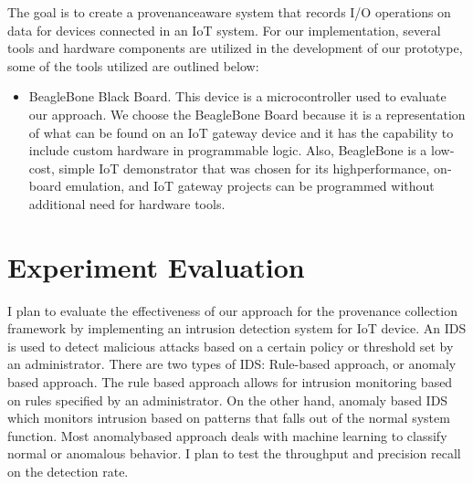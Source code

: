 The goal is to create a provenance\-aware system that records I/O operations on data for devices connected in an IoT system. For our implementation, several tools and hardware components are utilized in the development of our prototype, some of the tools utilized are outlined below:

\begin{itemize}
\item BeagleBone Black Board. This device is a microcontroller used to evaluate our approach. We choose the BeagleBone Board because it is a representation of what can be found on an IoT gateway device and it has the capability to include custom hardware in programmable logic. Also, BeagleBone is a low­cost, simple IoT demonstrator that was chosen for its high­performance, on­board emulation, and IoT gateway projects can be programmed without additional need for hardware tools.


\end{itemize}


\section{Experiment Evaluation}

I plan to evaluate the effectiveness of our approach for the provenance collection framework by implementing an intrusion detection system for IoT device. An IDS is used to detect malicious attacks based on a certain policy or threshold set by an administrator. There are two types of  IDS: Rule-based approach, or anomaly based approach. The rule based approach allows for intrusion monitoring based on rules specified by an administrator. On the other hand, anomaly based IDS which monitors intrusion based on patterns that falls out of the normal system function. Most anomaly\-based approach deals with machine learning to classify normal or anomalous behavior. I plan to test the throughput and precision recall on the detection rate.


%

